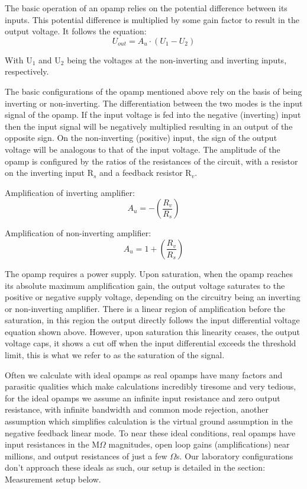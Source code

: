\documentclass[12pt]{article}
\begin{document}
The basic operation of an opamp relies on the potential difference between its inputs. This potential difference is multiplied by some gain factor to result in the output voltage. It follows the equation:
\begin{equation}
    U_{out} = A_u\cdot(U_1 - U_2)
\end{equation}

With U$_1$ and U$_2$ being the voltages at the non-inverting and inverting inputs, respectively.

The basic configurations of the opamp mentioned above rely on the basis of being inverting or non-inverting. The differentiation between the two modes is the input signal of the opamp. If the input voltage is fed into the negative (inverting) input then the input signal will be negatively multiplied resulting in an output of the opposite sign. On the non-inverting (positive) input, the sign of the output voltage will be analogous to that of the input voltage. The amplitude of the opamp is configured by the ratios of the resistances of the circuit, with a resistor on the inverting input R$_s$ and a feedback resistor R$_v$.

Amplification of inverting amplifier: 
\begin{equation}
    A_u=-\left( \frac{R_v}{R_s} \right) 
    \label{inv_opamp_amplification}
\end{equation}

Amplification of non-inverting amplifier: \begin{equation}
A_u=1+\left( \frac{R_v}{R_s} \right)
\label{noninv_opamp_amplification}
\end{equation}

The opamp requires a power supply. Upon saturation, when the opamp reaches its absolute maximum amplification gain, the output voltage saturates to the positive or negative supply voltage, depending on the circuitry being an inverting or non-inverting amplifier. There is a linear region of amplification before the saturation, in this region the output directly follows the input differential voltage equation shown above. However, upon saturation this linearity ceases, the output voltage caps, it shows a cut off when the input differential exceeds the threshold limit, this is what we refer to as the saturation of the signal.

Often we calculate with ideal opamps as real opamps have many factors and parasitic qualities which make calculations incredibly tiresome and very tedious, for the ideal opamps we assume an infinite input resistance and zero output resistance, with infinite bandwidth and common mode rejection, another assumption which simplifies calculation is the virtual ground assumption in the negative feedback linear mode. To near these ideal conditions, real opamps have input resistances in the M$\Omega$ magnitudes, open loop gains (amplifications) near millions, and output resistances of just a few $\Omega$s.
Our laboratory configurations don't approach these ideals as such, our setup is detailed in the section: Measurement setup below.
\end{document}
